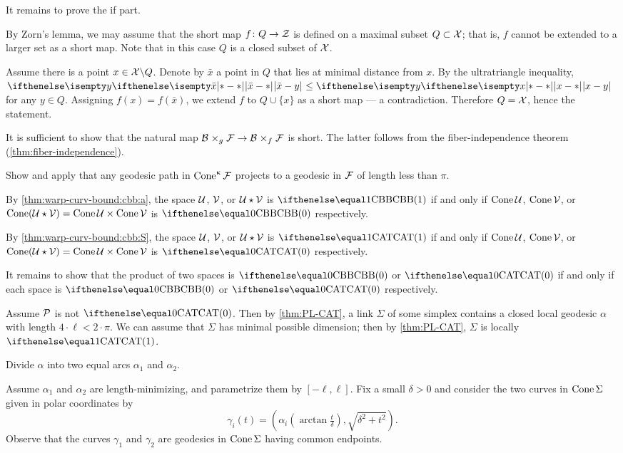 It remains to prove the if part.

By Zorn's lemma, we may assume that the short map $f\:Q\to \spc{Z}$ is defined on a maximal subset $Q\subset \spc{X}$;
that is, $f$ cannot be extended to a larger set as a short map.
Note that in this case $Q$ is a closed subset of $\mathcal{X}$.

Assume there is a point $x\in \spc{X}\backslash Q$.
Denote by $\bar x$ a point in $Q$ that lies at minimal distance from $x$.
By the ultratriangle inequality, $\dist{\bar x}{y}{}\le\dist{x}{y}{}$ for any $y\in Q$.
Assigning $f(x)=f(\bar x)$, we extend $f$ to $Q\cup\{x\}$ as a short map --- a contradiction.
Therefore $Q=\mathcal{X}$, hence the statement.


It is sufficient to show that the natural map $\spc{B}\warp{g}\spc{F}\to \spc{B}\warp{f}\spc{F}$ is short.
The latter follows from the fiber-independence theorem (\ref{thm:fiber-independence}).

Show and apply that any geodesic path in $\mathop{\rm Cone}\nolimits^\upkappa\mathcal{F}$ projects to a geodesic in $\mathcal{F}$ of length less than $\pi$.

By \ref{thm:warp-curv-bound:cbb:a}, the space $\mathcal{U}$, $\mathcal{V}$, or $\mathcal{U}\star\mathcal{V}$ is $\Alex1$ if and only if $\mathop{\rm Cone}\nolimits\mathcal{U}$, $\mathop{\rm Cone}\nolimits\mathcal{V}$, or $\Cone(\spc{U}\star\spc{V})=\Cone\spc{U}\times\Cone\spc{V}$ is $\Alex0$ respectively.

By \ref{thm:warp-curv-bound:cbb:S}, the space $\mathcal{U}$, $\mathcal{V}$, or $\mathcal{U}\star\mathcal{V}$ is $\CAT1$ if and only if $\mathop{\rm Cone}\nolimits\mathcal{U}$, $\mathop{\rm Cone}\nolimits\mathcal{V}$, or $\Cone(\spc{U}\star\spc{V})=\Cone\spc{U}\times\Cone\spc{V}$ is $\CAT0$ respectively.

It remains to show that the product of two spaces is $\Alex0$ or $\CAT0$ if and only if each space is $\Alex0$ or $\CAT0$ respectively.

Assume $\mathcal{P}$ is not $\CAT0$.
Then by \ref{thm:PL-CAT}, a link $\Sigma$ of some simplex contains a closed local geodesic $\alpha$ with length $4\cdot\ell<2\cdot\pi$.
We can assume that $\Sigma$ has minimal possible dimension;
then by \ref{thm:PL-CAT}, $\Sigma$ is locally $\CAT1$.

Divide $\alpha$ into two equal arcs $\alpha_1$ and $\alpha_2$.

Assume $\alpha_1$ and $\alpha_2$ are length-minimizing, and 
parametrize them by $[-\ell,\ell]$.
Fix a small $\delta>0$ and 
consider the two curves in $\mathop{\rm Cone}\nolimits\Sigma$ given in polar coordinates by 
\[\gamma_i(t)=(\alpha_i(\arctan \tfrac t\delta),\sqrt{\delta^2+t^2}).\]
Observe that the curves $\gamma_1$ and $\gamma_2$ are geodesics in $\mathop{\rm Cone}\nolimits\Sigma$ having common endpoints.

